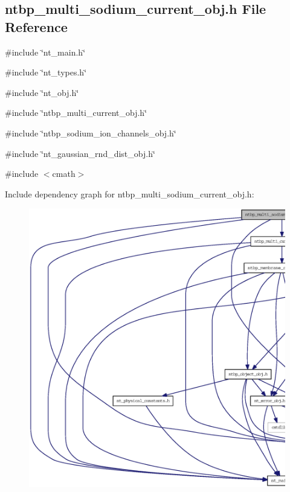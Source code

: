 \subsection{ntbp\_\-multi\_\-sodium\_\-current\_\-obj.h File Reference}
\label{ntbp__multi__sodium__current__obj_8h}
{\ttfamily \#include \char`\"{}nt\_\-main.h\char`\"{}}\par
{\ttfamily \#include \char`\"{}nt\_\-types.h\char`\"{}}\par
{\ttfamily \#include \char`\"{}nt\_\-obj.h\char`\"{}}\par
{\ttfamily \#include \char`\"{}ntbp\_\-multi\_\-current\_\-obj.h\char`\"{}}\par
{\ttfamily \#include \char`\"{}ntbp\_\-sodium\_\-ion\_\-channels\_\-obj.h\char`\"{}}\par
{\ttfamily \#include \char`\"{}nt\_\-gaussian\_\-rnd\_\-dist\_\-obj.h\char`\"{}}\par
{\ttfamily \#include $<$cmath$>$}\par
Include dependency graph for ntbp\_\-multi\_\-sodium\_\-current\_\-obj.h:
\nopagebreak
\begin{figure}[H]
\begin{center}
\leavevmode
\includegraphics[width=400pt]{ntbp__multi__sodium__current__obj_8h__incl}
\end{center}
\end{figure}
